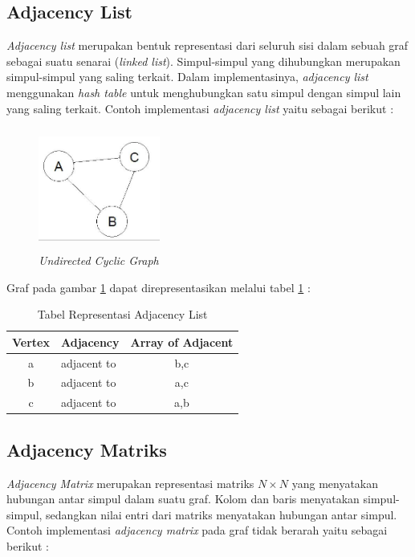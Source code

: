 \subsection{Adjacency List}
\textit{Adjacency list} merupakan bentuk representasi dari seluruh sisi dalam sebuah graf sebagai suatu senarai (\textit{linked list}). Simpul-simpul yang dihubungkan merupakan simpul-simpul yang saling terkait. Dalam implementasinya, \textit{adjacency list} menggunakan \textit{hash table} untuk menghubungkan satu simpul dengan simpul lain yang saling terkait. Contoh implementasi \textit{adjacency list} yaitu sebagai berikut :

 	\begin{figure} [H]
		\centering  
		\includegraphics[width=4cm, height=4cm]{adjacencylist} 
		\caption[\textit{Undirected Cyclic Graph}]{\textit{Undirected Cyclic Graph}}
		\label{fig:GambarAL} 
	\end{figure}
	
	Graf pada gambar \ref{fig:GambarAL} dapat direpresentasikan melalui tabel \ref{tabelAL} :
	
	
	\begin{table}[H]
\centering
\caption{Tabel Representasi Adjacency List}
\begin{tabular}{|c|p{2cm}|c|}
\hline
Vertex & Adjacency & Array of Adjacent\\
\hline
a & adjacent to & b,c \\
\hline
b & adjacent to & a,c \\
\hline
c & adjacent to & a,b\\
\hline
\end{tabular}
\label{tabelAL}
\end{table}

\subsection{Adjacency Matriks}
\textit{Adjacency Matrix} merupakan representasi matriks $N \times N$ yang menyatakan hubungan antar simpul dalam suatu graf. Kolom dan baris menyatakan simpul-simpul, sedangkan nilai entri dari matriks menyatakan hubungan antar simpul. Contoh implementasi \textit{adjacency matrix} pada graf tidak berarah yaitu sebagai berikut :

